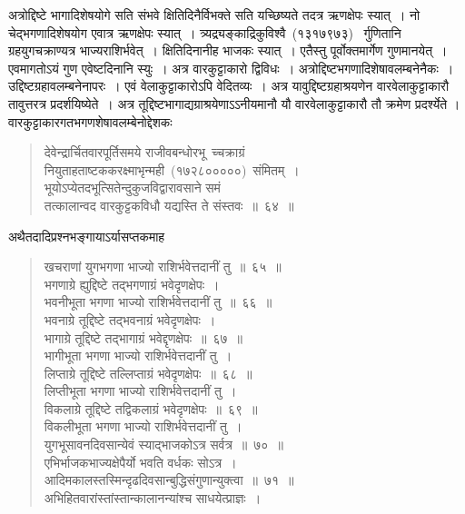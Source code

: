 \documentclass[11pt, openany]{book}
\begin{document}
\indent
अत्रोद्दिष्टे भागादिशेषयोगे सति संभवे क्षितिदिनैर्विभक्ते सति यच्छिष्यते तदत्र ऋणक्षेपः स्यात्~। नो चेद्भगणादिशेषयोग एवात्र ऋणक्षेपः स्यात्~। त्र्यद्र्यङ्काद्रिकुविश्वै~(१३१७९७३)~ र्गुणितानि ग्रहयुगचक्राण्यत्र भाज्यराशिर्भवेत्~। क्षितिदिनानीह भाजकः स्यात्~। एतैस्तु पूर्वोक्तमार्गेण गुणमानयेत्~। एवमागतोऽयं गुण एवेष्टदिनानि स्युः~। अत्र वारकुट्टाकारो द्विविधः~। अत्रोद्दिष्टभगणादिशेषावलम्बनेनैकः~।उद्दिष्टग्रहावलम्बनेनापरः~। एवं वेलाकुट्टाकारोऽपि वेदितव्यः~। अत्र यावुद्दिष्टग्रहाश्रयणेन
वारवेलाकुट्टाकारौ तावुत्तरत्र प्रदर्शयिष्येते~। अत्र तूद्दिष्टभागाद्यग्राश्रयेणाऽऽनीयमानौ
यौ वारवेलाकुट्टाकारौ तौ क्रमेण प्रदर्श्येते । वारकुट्टाकारगतभगणशेषावलम्बेनोद्देशकः\textendash

\begin{quote}
{\ks देवेन्द्रार्चितवारपूर्तिसमये राजीवबन्धोरभू\textendash\
च्चक्राग्रं नियुताहताष्टककरक्ष्माभृन्मही~(१७२८०००००)~संमितम्~।\\
भूयोऽप्येतदभूत्सितेन्दुकुजविद्वारावसाने समं\\
तत्कालान्वद वारकुट्टकविधौ यद्यस्ति ते संस्तवः~॥~६४~॥}
\end{quote}

\newpage
\thispagestyle{fancy}
\fancyhf{}

\indent
अथैतदादिप्रश्नभङ्गायाऽर्यासप्तकमाह\textendash\

\begin{quote}
{\ks खचराणां युगभगणा भाज्यो राशिर्भवेत्तदानीं तु~॥~६५~॥\\
भगणाग्रे ह्युद्दिष्टे तद्भगणाग्रं भवेदृणक्षेपः~।\\
भवनीभूता भगणा भाज्यो राशिर्भवेत्तदानीं तु~॥~६६~॥\\
भवनाग्रे तूद्दिष्टे तद्भवनाग्रं भवेदृणक्षेपः~।\\
भागाग्रे तूद्दिष्टे तद्भागाग्रं भवेद्दृणक्षेपः~॥~६७~॥\\
भागीभूता भगणा भाज्यो राशिर्भवेत्तदानीं तु~।\\
लिप्ताग्रे तूद्दिष्टे तल्लिप्ताग्रं भवेदृणक्षेपः~॥~६८~॥\\
लिप्तीभूता भगणा भाज्यो राशिर्भवेत्तदानीं तु~।\\
विकलाग्रे तूद्दिष्टे तद्विकलाग्रं भवेदृणक्षेपः~॥~६९~॥\\
विकलीभूता भगणा भाज्यो राशिर्भवेत्तदानीं तु~।\\
युगभूसावनदिवसान्येवं स्याद्भाजकोऽत्र सर्वत्र~॥~७०~॥\\
एभिर्भाजकभाज्यक्षेपैर्यो भवति वर्धकः सोऽत्र~।\\
आदिमकालस्तस्मिन्दृढदिवसान्बुद्धिसंगुणान्युक्त्वा~॥~७१~॥\\
अभिहितवारांस्तांस्तान्कालानन्यांश्च साधयेत्प्राज्ञः~।}
\end{quote}
\end{document}
